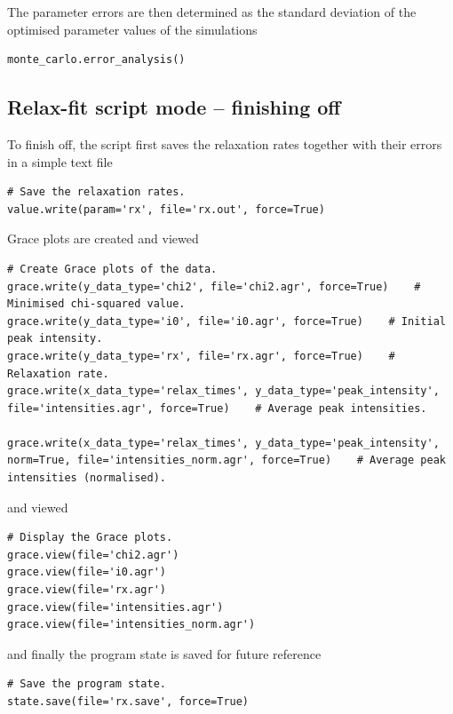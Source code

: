 The parameter errors are then determined as the standard deviation of the optimised parameter values of the simulations

\begin{lstlisting}[firstnumber=73]
monte_carlo.error_analysis()
\end{lstlisting}



\subsection{Relax-fit script mode -- finishing off}

To finish off, the script first saves the relaxation rates together with their errors in a simple text file

\begin{lstlisting}[firstnumber=75]
# Save the relaxation rates.
value.write(param='rx', file='rx.out', force=True)
\end{lstlisting}

Grace plots are created and viewed

\begin{lstlisting}[firstnumber=81]
# Create Grace plots of the data.
grace.write(y_data_type='chi2', file='chi2.agr', force=True)    # Minimised chi-squared value.
grace.write(y_data_type='i0', file='i0.agr', force=True)    # Initial peak intensity.
grace.write(y_data_type='rx', file='rx.agr', force=True)    # Relaxation rate.
grace.write(x_data_type='relax_times', y_data_type='peak_intensity', file='intensities.agr', force=True)    # Average peak intensities.

grace.write(x_data_type='relax_times', y_data_type='peak_intensity', norm=True, file='intensities_norm.agr', force=True)    # Average peak intensities (normalised).
\end{lstlisting}

and viewed

\begin{lstlisting}[firstnumber=88]
# Display the Grace plots.
grace.view(file='chi2.agr')
grace.view(file='i0.agr')
grace.view(file='rx.agr')
grace.view(file='intensities.agr')
grace.view(file='intensities_norm.agr')
\end{lstlisting}

and finally the program state is saved for future reference

\begin{lstlisting}[firstnumber=95]
# Save the program state.
state.save(file='rx.save', force=True)
\end{lstlisting}



